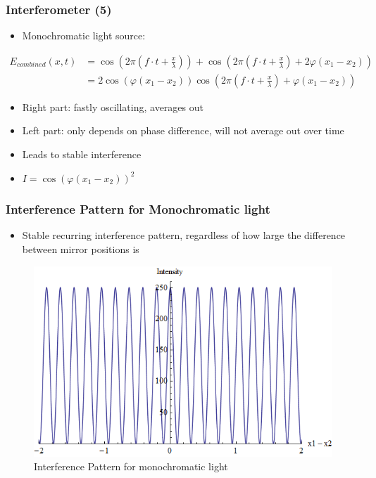 \begin{frame}
    \frametitle{Interferometer (5)}


    \begin{itemize}
        \item Monochromatic light source:


    \end{itemize}
    \begin{align}
        E_{combined}(x,t) & =\cos\left( 2 \pi \left(f \cdot t + \frac{x}{\lambda} \right) \right) + \cos\left(2 \pi \left( f \cdot t + \frac{x}{\lambda} \right) + 2\varphi\left(x_1-x_2\right)\right) \\
                          & = 2 \cos\left( \varphi\left(x_1-x_2\right)\right) \cos\left( 2 \pi\left( f \cdot t + \frac{x}{\lambda} \right) + \varphi\left(x_1-x_2\right)\right)
    \end{align}

    \begin{itemize}
        \item Right part: fastly oscillating, averages out
        \item Left part: only depends on phase difference, will not average out over time
        \item Leads to stable interference
        \item $I = \cos\left(\varphi\left(x_1-x_2\right)\right)^2$
    \end{itemize}


\end{frame}


\begin{frame}
    \frametitle{Interference Pattern for Monochromatic light}
    \begin{itemize}
        \item Stable recurring interference pattern, regardless of how large the difference between mirror positions is
    \end{itemize}

    \begin{figure}
        \includegraphics[height=0.65\textheight]{figures/Interference0.png}
        \caption{Interference Pattern for monochromatic light}
    \end{figure}

\end{frame}


